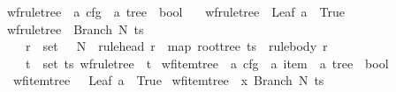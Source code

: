 \begin{isabellebody}
\isanewline
{}\isamarkupfalse%
\ wf{\isacharunderscore}{\kern0pt}rule{\isacharunderscore}{\kern0pt}tree\ {\isacharcolon}{\kern0pt}{\isacharcolon}{\kern0pt}\ {\isachardoublequoteopen}{\isacharprime}{\kern0pt}a\ cfg\ {\isasymRightarrow}\ {\isacharprime}{\kern0pt}a\ tree\ {\isasymRightarrow}\ bool{\isachardoublequoteclose}\ \isanewline
\ \ {\isachardoublequoteopen}wf{\isacharunderscore}{\kern0pt}rule{\isacharunderscore}{\kern0pt}tree\ {\isacharunderscore}{\kern0pt}\ {\isacharparenleft}{\kern0pt}Leaf\ a{\isacharparenright}{\kern0pt}\ {\isasymlongleftrightarrow}\ True{\isachardoublequoteclose}\isanewline
{\isacharbar}{\kern0pt}\ {\isachardoublequoteopen}wf{\isacharunderscore}{\kern0pt}rule{\isacharunderscore}{\kern0pt}tree\ {\isasymG}\ {\isacharparenleft}{\kern0pt}Branch\ N\ ts{\isacharparenright}{\kern0pt}\ {\isasymlongleftrightarrow}\ {\isacharparenleft}{\kern0pt}\isanewline
\ \ \ \ {\isacharparenleft}{\kern0pt}{\isasymexists}r\ {\isasymin}\ set\ {\isacharparenleft}{\kern0pt}{\isasymRR}\ {\isasymG}{\isacharparenright}{\kern0pt}{\isachardot}{\kern0pt}\ N\ {\isacharequal}{\kern0pt}\ rule{\isacharunderscore}{\kern0pt}head\ r\ {\isasymand}\ map\ root{\isacharunderscore}{\kern0pt}tree\ ts\ {\isacharequal}{\kern0pt}\ rule{\isacharunderscore}{\kern0pt}body\ r{\isacharparenright}{\kern0pt}\ {\isasymand}\isanewline
\ \ \ \ {\isacharparenleft}{\kern0pt}{\isasymforall}t\ {\isasymin}\ set\ ts{\isachardot}{\kern0pt}\ wf{\isacharunderscore}{\kern0pt}rule{\isacharunderscore}{\kern0pt}tree\ {\isasymG}\ t{\isacharparenright}{\kern0pt}{\isacharparenright}{\kern0pt}{\isachardoublequoteclose}\isanewline
\isanewline
{}\isamarkupfalse%
\ wf{\isacharunderscore}{\kern0pt}item{\isacharunderscore}{\kern0pt}tree\ {\isacharcolon}{\kern0pt}{\isacharcolon}{\kern0pt}\ {\isachardoublequoteopen}{\isacharprime}{\kern0pt}a\ cfg\ {\isasymRightarrow}\ {\isacharprime}{\kern0pt}a\ item\ {\isasymRightarrow}\ {\isacharprime}{\kern0pt}a\ tree\ {\isasymRightarrow}\ bool{\isachardoublequoteclose}\ \isanewline
\ \ {\isachardoublequoteopen}wf{\isacharunderscore}{\kern0pt}item{\isacharunderscore}{\kern0pt}tree\ {\isasymG}\ {\isacharunderscore}{\kern0pt}\ {\isacharparenleft}{\kern0pt}Leaf\ a{\isacharparenright}{\kern0pt}\ {\isasymlongleftrightarrow}\ True{\isachardoublequoteclose}\isanewline
{\isacharbar}{\kern0pt}\ {\isachardoublequoteopen}wf{\isacharunderscore}{\kern0pt}item{\isacharunderscore}{\kern0pt}tree\ {\isasymG}\ x\ {\isacharparenleft}{\kern0pt}Branch\ N\ ts{\isacharparenright}{\kern0pt}\ {\isasymlongleftrightarrow}\ {\isacharparenleft}{\kern0pt}\isanewline

\end{isabellebody}
